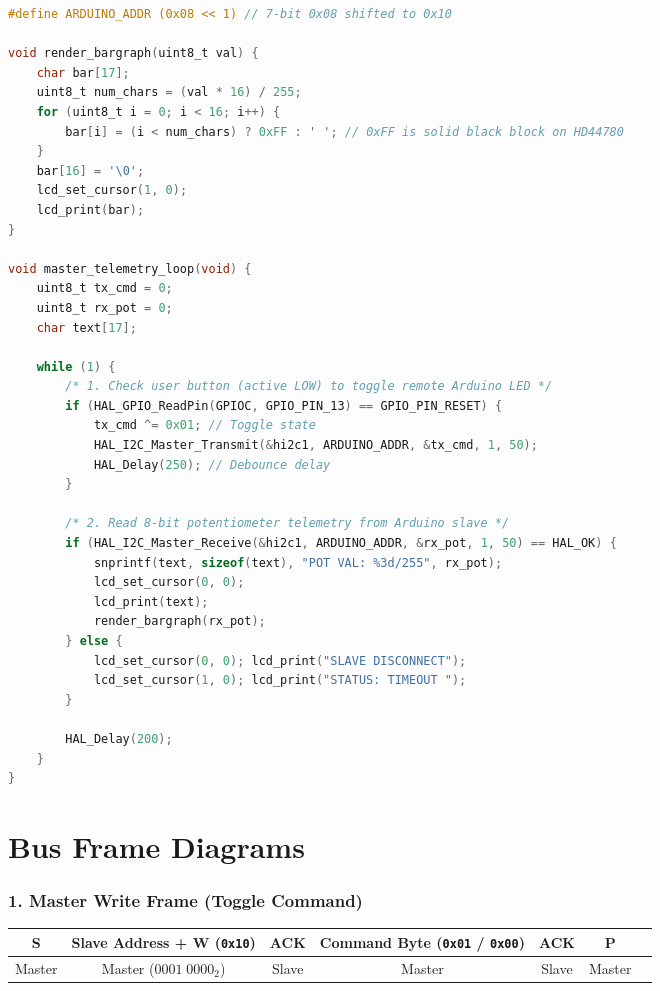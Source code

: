 \documentclass[11pt,a4paper]{article}
\begin{document}
\begin{lstlisting}[language=C, caption={STM32 Master Firmware with Bargraph Rendering}]
#define ARDUINO_ADDR (0x08 << 1) // 7-bit 0x08 shifted to 0x10

void render_bargraph(uint8_t val) {
    char bar[17];
    uint8_t num_chars = (val * 16) / 255;
    for (uint8_t i = 0; i < 16; i++) {
        bar[i] = (i < num_chars) ? 0xFF : ' '; // 0xFF is solid black block on HD44780
    }
    bar[16] = '\0';
    lcd_set_cursor(1, 0);
    lcd_print(bar);
}

void master_telemetry_loop(void) {
    uint8_t tx_cmd = 0;
    uint8_t rx_pot = 0;
    char text[17];

    while (1) {
        /* 1. Check user button (active LOW) to toggle remote Arduino LED */
        if (HAL_GPIO_ReadPin(GPIOC, GPIO_PIN_13) == GPIO_PIN_RESET) {
            tx_cmd ^= 0x01; // Toggle state
            HAL_I2C_Master_Transmit(&hi2c1, ARDUINO_ADDR, &tx_cmd, 1, 50);
            HAL_Delay(250); // Debounce delay
        }

        /* 2. Read 8-bit potentiometer telemetry from Arduino slave */
        if (HAL_I2C_Master_Receive(&hi2c1, ARDUINO_ADDR, &rx_pot, 1, 50) == HAL_OK) {
            snprintf(text, sizeof(text), "POT VAL: %3d/255", rx_pot);
            lcd_set_cursor(0, 0);
            lcd_print(text);
            render_bargraph(rx_pot);
        } else {
            lcd_set_cursor(0, 0); lcd_print("SLAVE DISCONNECT");
            lcd_set_cursor(1, 0); lcd_print("STATUS: TIMEOUT ");
        }

        HAL_Delay(200);
    }
}
\end{lstlisting}

\section{Bus Frame Diagrams}

\subsubsection*{1. Master Write Frame (Toggle Command)}
\begin{center}
\small
\begin{tabular}{|c|c|c|c|c|c|c|}
\hline
\textbf{S} & \textbf{Slave Address + W (\texttt{0x10})} & \textbf{ACK} & \textbf{Command Byte (\texttt{0x01} / \texttt{0x00})} & \textbf{ACK} & \textbf{P} \\
\hline
Master & Master ($0001\;0000_2$) & Slave & Master & Slave & Master \\
\hline
\end{tabular}
\end{center}
\end{document}
